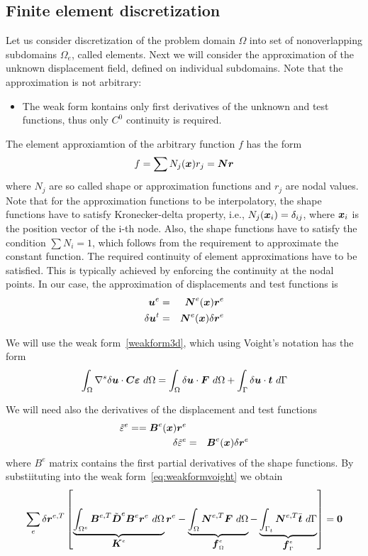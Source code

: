 \documentclass[11pt]{article}
\begin{document}
\subsection{Finite element discretization}
Let us consider discretization of the problem domain $\Omega$ into set of nonoverlapping subdomains $\Omega_e$, called elements.
Next we will consider the approximation of the unknown displacement field, defined on individual subdomains. Note that the approximation is not arbitrary:
\begin{itemize}
  \item The weak form kontains only first derivatives of the unknown and test functions, thus only $C^0$ continuity is required.
\end{itemize}
The element approxiamtion of the arbitrary function $f$ has the form
$$
f = \sum N_j(\mbox{\boldmath$x$})r_j  = \mbox{\boldmath$N$}\mbox{\boldmath$r$}
$$
where $N_j$ are so called shape or approximation functions and $r_j$ are nodal values.
Note that for the approximation functions to be interpolatory, the shape functions have to satisfy Kronecker-delta property, i.e., $N_j(\mbox{\boldmath$x$}_i)=\delta_{ij}$, where $\mbox{\boldmath$x$}_i$ is the position vector of the i-th node. Also, the shape functions have to satisfy the condition $\sum N_i=1$, which follows from the requirement to approximate the constant function.
The required continuity of element approximations have to be satisfied. This is typically achieved by enforcing the continuity at the nodal points.
In our case, the approximation of displacements and test functions is
\begin{eqnarray}
  \mbox{\boldmath$u$}^e&=&\mbox{\boldmath$N$}^e(\mbox{\boldmath$x$})\mbox{\boldmath$r$}^e\\
  \delta\mbox{\boldmath$u$}^t&=&\mbox{\boldmath$N$}^e(\mbox{\boldmath$x$})\delta\mbox{\boldmath$r$}^e
\end{eqnarray}

We will use the weak form~\ref{weakform3d}, which using Voight's notation has the form
$$
  \int_\Omega\grad^s\delta\mbf{u}\cdot\mbf{C}\mbf{\eps}\ d\Omega =
  \int_\Omega\delta\mbf{u}\cdot\mbf{F}\ d\Omega + \int_\Gamma\delta\mbf{u}\cdot\mbf{t}\ d\Gamma
$$

  We will need also the derivatives of the displacement and test functions
  \begin{eqnarray}
  \tilde{\varepsilon}^e = = \mbox{\boldmath$B$}^e(\mbox{\boldmath$x$})\mbox{\boldmath$r$}^e\\
  \delta\tilde{\varepsilon}^e&=&\mbox{\boldmath$B$}^e(\mbox{\boldmath$x$})\delta\mbox{\boldmath$r$}^e
\end{eqnarray}
where $B^e$ matrix contains the first partial derivatives of the shape functions. 
By substiituting into the weak form~\ref{eq:weakformvoight} we obtain
\begin{equation}
  \sum_e \delta\mbf{r}^{e,T}
  \left[
    \underbrace{\int_{\Omega^e} \mbf{B}^{e,T}\tilde{\mbf{D}}^e\mbf{B}^e\mbf{r}^e\ d\Omega}_{\mbf{K}^e}\mbf{r}^e-\underbrace{\int_{\Omega}\mbf{N}^{e,T}\mbf{F}\ d\Omega}_{\mbf{f}^e_\Omega} - \underbrace{\int_{\Gamma_t}\mbf{N}^{e,T}\bar{\mbf{t}}\ d\Gamma}_{\mbf{f}^e_\Gamma}
    \right] = \mbf{0}
\end{equation}
\end{document}
